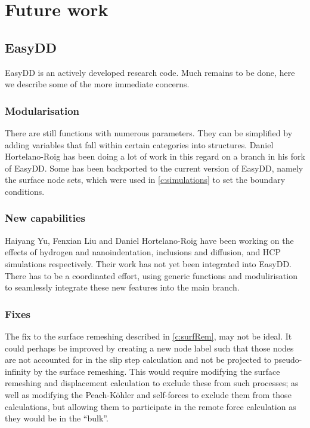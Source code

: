 \chapter{Future work}
\label{c:future}

\section{EasyDD}

EasyDD is an actively developed research code. Much remains to be done, here we describe some of the more immediate concerns.

\subsection{Modularisation}

There are still functions with numerous parameters. They can be simplified by adding variables that fall within certain categories into structures. Daniel Hortelano-Roig has been doing a lot of work in this regard on a branch in his fork of EasyDD. Some has been backported to the current version of EasyDD, namely the surface node sets, which were used in \cref{c:simulations} to set the boundary conditions.

\subsection{New capabilities}

Haiyang Yu, Fenxian Liu and Daniel Hortelano-Roig have been working on the effects of hydrogen and nanoindentation, inclusions and diffusion, and HCP simulations respectively. Their work has not yet been integrated into EasyDD. There has to be a coordinated effort, using generic functions and modulirisation to seamlessly integrate these new features into the main branch.

\subsection{Fixes}

The fix to the surface remeshing described in \cref{c:surfRem}, may not be ideal. It could perhaps be improved by creating a new node label such that those nodes are not accounted for in the slip step calculation and not be projected to pseudo-infinity by the surface remeshing. This would require modifying the surface remeshing and displacement calculation to exclude these from such processes; as well as modifying the Peach-K\"{o}hler and self-forces to exclude them from those calculations, but allowing them to participate in the remote force calculation as they would be in the ``bulk''.

